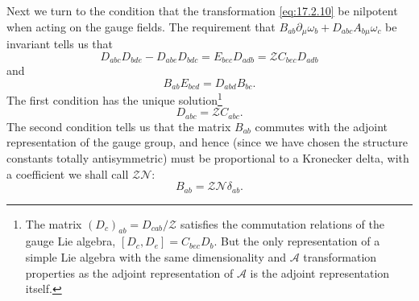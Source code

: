 Next we turn to the condition that the transformation \eqref{eq:17.2.10} be nilpotent when acting on the gauge fields. The requirement that $B_{ab}\partial_\mu\omega_b+D_{abc}A_{b\mu}\omega_c$ be invariant tells us that
\[
D_{abc}D_{bde}
-D_{abe}D_{bdc}
=E_{bec}D_{adb}
=\mathcal Z C_{bec}D_{adb}
\]
and
\[
B_{ab}E_{bcd}=D_{abd}B_{bc}.
\]
The first condition has the unique solution\footnote{The matrix $(D_c)_{ab}=D_{cab}/\mathcal Z$ satisfies the commutation relations of the gauge Lie algebra, $[D_c,D_e]=C_{bec}D_b$. But the only representation of a simple Lie algebra with the same dimensionality and $\mathcal A$ transformation properties as the adjoint representation of $\mathcal A$ is the adjoint representation itself.}
\[
D_{abc}=\mathcal Z C_{abc}.
\]
The second condition tells us that the matrix $B_{ab}$ commutes with the adjoint representation of the gauge group, and hence (since we have chosen the structure constants totally antisymmetric) must be proportional to a Kronecker delta, with a coefficient we shall call $\mathcal Z\mathcal N$:
\[
B_{ab}=\mathcal Z\mathcal N\delta_{ab}.
\]


